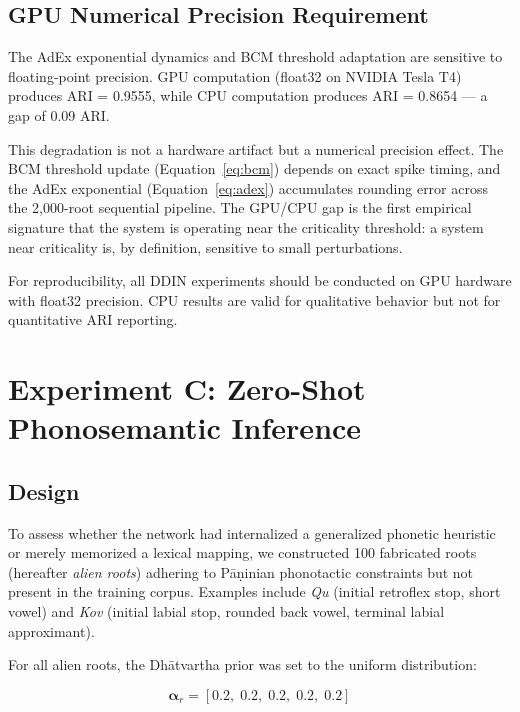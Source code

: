 \documentclass{article}
\begin{document}
\subsection{GPU Numerical Precision Requirement}

The AdEx exponential dynamics and BCM threshold adaptation are sensitive to
floating-point precision. GPU computation (float32 on NVIDIA Tesla T4) produces
ARI = 0.9555, while CPU computation produces ARI = 0.8654 — a gap of 0.09 ARI.

This degradation is not a hardware artifact but a numerical precision effect.
The BCM threshold update (Equation~\ref{eq:bcm}) depends on exact spike timing,
and the AdEx exponential (Equation~\ref{eq:adex}) accumulates rounding error across
the 2,000-root sequential pipeline. The GPU/CPU gap is the first empirical
signature that the system is operating near the criticality threshold: a system
near criticality is, by definition, sensitive to small perturbations.

For reproducibility, all DDIN experiments should be conducted on GPU hardware with
float32 precision. CPU results are valid for qualitative behavior but not for
quantitative ARI reporting.

\section{Experiment C: Zero-Shot Phonosemantic Inference}

\subsection{Design}

To assess whether the network had internalized a generalized phonetic heuristic or
merely memorized a lexical mapping, we constructed 100 fabricated roots (hereafter
\textit{alien roots}) adhering to Pāṇinian phonotactic constraints but not present in
the training corpus. Examples include \textit{Qu} (initial retroflex stop, short vowel)
and \textit{Kov} (initial labial stop, rounded back vowel, terminal labial
approximant).

For all alien roots, the Dhātvartha prior was set to the uniform distribution:

\begin{equation}
  \boldsymbol{\alpha}_r = [0.2,\; 0.2,\; 0.2,\; 0.2,\; 0.2]
  \label{eq:uniform_prior}
\end{equation}
\end{document}
